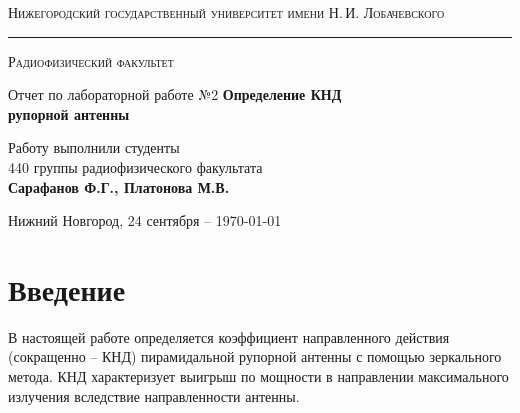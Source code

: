 \documentclass[a4paper,14pt]{extarticle}
\def\labauthors{Сарафанов Ф.Г., Платонова М.В.}
\def\labnumber{2}
\begin{document}
\begin{titlepage}
\begin{center}
{\small\textsc{Нижегородский государственный университет имени Н.\,И. Лобачевского}}
\vskip 2pt \hrule \vskip 3pt
{\small\textsc{Радиофизический факультет}}

\vfill


{{\large Отчет по лабораторной работе №\labnumber}\vskip 12pt {\LARGE \bfseries Определение КНД \\[0.2em] рупорной антенны}}

	
\vspace{2cm}
{\large Работу выполнили студенты \\[-0.25em] 440 группы радиофизического факультата \\[0.5em] {\Large \bfseries \labauthors}}



\end{center}

\vfill
	
	
	
\begin{center}
	{Нижний Новгород, 24 сентября -- \today}
\end{center}

\end{titlepage}
\tableofcontents
\newpage



\section*{Введение}

В настоящей работе определяется коэффициент направленного действия (сокращенно -- КНД) пирамидальной рупорной антенны с помощью зеркального метода. КНД характеризует выигрыш по мощности в направлении максимального излучения вследствие направленности антенны.
\end{document}
